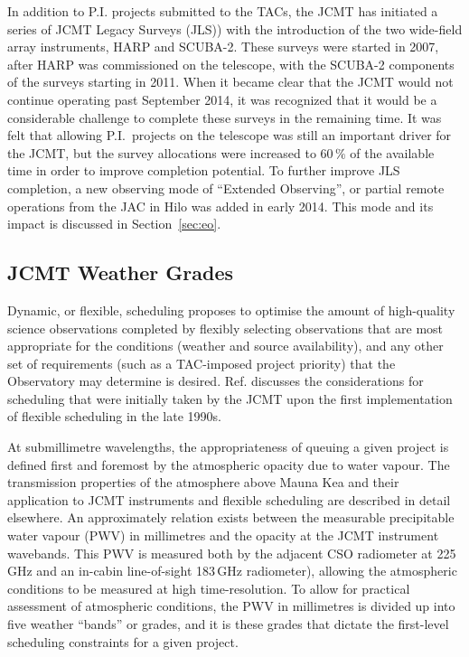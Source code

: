 \documentclass[]{spie}  %
\begin{document}
In addition to P.I. projects submitted to the TACs, the JCMT has
initiated a series of JCMT Legacy Surveys (JLS))\cite{2005prpl.conf.8370M,2007PASP..119..102P,2007PASP..119..842M,2007PASP..119..855W,2007arXiv0704.3202T,2009ApJ...693.1736W,2013MNRAS.432...53G} with the introduction
of the two wide-field array instruments, HARP and SCUBA-2. These
surveys were started in 2007, after HARP was commissioned on the
telescope, with the SCUBA-2 components of the surveys starting in
2011. When it became clear that the JCMT would not continue operating
past September 2014, it was recognized that it would be a considerable
challenge to complete these surveys in the remaining time. It was felt
that allowing P.I.\ projects on the telescope was still an important
driver for the JCMT, but the survey allocations were increased to
60\,$\%$ of the available time in order to improve completion
potential. To further improve JLS completion, a new observing mode of
``Extended Observing'', or partial remote operations from the JAC in
Hilo was added in early 2014. This mode and its impact is discussed in
Section~\ref{sec:eo}.

\subsection{JCMT Weather Grades}

Dynamic, or flexible, scheduling proposes to optimise the amount of
high-quality science observations completed by flexibly selecting
observations that are most appropriate for the conditions (weather and
source availability), and any other set of requirements (such as a
TAC-imposed project priority) that the Observatory may determine is
desired. Ref.  discusses the considerations for
scheduling that were initially taken by the JCMT upon the first
implementation of flexible scheduling in the late 1990s.

At submillimetre wavelengths, the appropriateness of queuing a given
project is defined first and foremost by the atmospheric opacity due
to water vapour. The transmission properties of the atmosphere above
Mauna Kea and their application to JCMT instruments and flexible
scheduling are described in detail elsewhere\cite{robson2002}. An approximately relation exists between the measurable precipitable water
vapour (PWV) in millimetres and the opacity at the JCMT instrument
wavebands.\cite{2013MNRAS.430.2534D,archibald} This PWV is measured both by the adjacent CSO radiometer at
225\,GHz and an in-cabin line-of-sight 183\,GHz radiometer\cite{wiedner,2008SPIE.7012E.137D}),
allowing the atmospheric conditions to be measured at high
time-resolution. To allow for practical assessment of atmospheric
conditions, the PWV in millimetres is divided up into five weather ``bands'' or
grades, and it is these grades that dictate the first-level scheduling
constraints for a given project.
\end{document}
